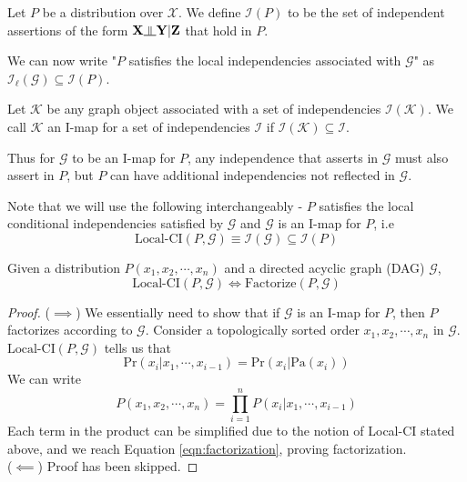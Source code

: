 \begin{defn}
Let $P$ be a distribution over $\mathcal X$. We define $\mathcal{I}(P)$ to be the set of independent assertions of the form $\mathbf X \ind \mathbf Y | \mathbf Z$ that hold in $P$.
\end{defn}
We can now write "$P$ satisfies the local independencies associated with $\mathcal  G$" as $\mathcal{I}_\ell(\mathcal G) \subseteq \mathcal{I}(P)$.
\begin{defn}
Let $\mathcal K$ be any graph object associated with a set of independencies $\mathcal{I}(\mathcal K)$. We call $\mathcal K$ an I-map for a set of independencies $\mathcal I$ if $\mathcal I(\mathcal K) \subseteq \mathcal I$.
\end{defn}
Thus for $\mathcal G$ to be an I-map for $P$, any independence that asserts in $\mathcal G$ must also assert in $P$, but $P$ can have additional independencies not reflected in $\mathcal G$.
\begin{rem}
Note that we will use the following interchangeably - $P$ satisfies the local conditional independencies satisfied by $\mathcal G$ and $\mathcal G$ is an I-map for $P$, i.e
\begin{equation}
	\text{Local-CI}(P, \mathcal G) \equiv \mathcal{I(G)} \subseteq \mathcal{I}(P)
\end{equation}
\end{rem}
\begin{thm}
Given a distribution $P(x_1, x_2, \cdots, x_n)$ and a directed acyclic graph (DAG) $\mathcal{G}$, 
\begin{equation}
\text{Local-CI}(P, \mathcal G) \Longleftrightarrow \text{Factorize}(P, \mathcal G)
\end{equation}
\end{thm}
\begin{proof}
($\implies$) We essentially need to show that if $\mathcal{G}$ is an I-map for $P$, then $P$ factorizes according to $\mathcal G$. Consider a topologically sorted order $x_1, x_2, \cdots, x_n$ in $\mathcal G$. $\text{Local-CI}(P, \mathcal G)$ tells us that $$\text{Pr}(x_i|x_{1}, \cdots, x_{i-1}) = \text{Pr}(x_i|\text{Pa}(x_i))$$
We can write
$$P(x_1, x_2, \cdots, x_n) = \prod_{i=1}^nP(x_i|x_1, \cdots, x_{i-1})$$
Each term in the product can be simplified due to the notion of Local-CI stated above, and we reach Equation \ref{eqn:factorization}, proving factorization. \\
($\impliedby$) Proof has been skipped.
\end{proof}
